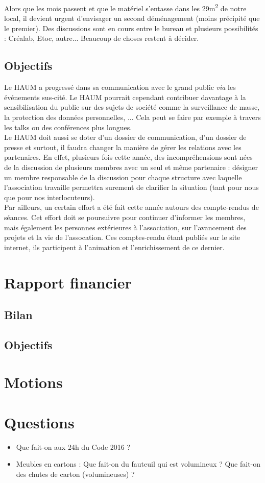 \documentclass[11pt]{article}
\begin{document}
Alors que les mois passent et que le matériel s'entasse dans les 29m\textsuperscript{2} de notre local, il devient
urgent d'envisager un second déménagement (moins précipité que le premier). Des discussions sont en cours entre le bureau et plusieurs
possibilités : Créalab, Etoc, autre... Beaucoup de choses restent à décider.

\subsection{Objectifs}

Le HAUM a progressé dans sa communication avec le grand public \textit{via} les événements sus-cité. Le HAUM pourrait cependant contribuer davantage à la sensibilisation du public sur
des sujets de société comme la surveillance de masse, la protection des données personnelles, ... Cela peut se faire par exemple à travers les talks ou des conférences plus longues.\\



Le HAUM doit aussi se doter d'un dossier de communication, d'un dossier
de presse et surtout, il faudra changer la manière de gérer les relations avec les partenaires.
En effet, plusieurs fois cette année, des incompréhensions sont nées de la discussion de plusieurs membres avec un seul
et même partenaire : désigner un membre responsable de la discussion pour chaque structure avec laquelle l'association
travaille permettra surement de clarifier la situation (tant pour nous que pour nos interlocuteurs).\\
Par ailleurs, un certain effort a \'et\'e fait cette ann\'ee autours des compte-rendus de s\'eances. Cet effort doit se poursuivre pour continuer d'informer les membres, mais \'egalement les personnes ext\'erieures \`a l'association, sur l'avancement des projets et la vie de l'assocation. Ces comptes-rendu \'etant publi\'es sur le site internet, ils participent \`a l'animation et l'enrichissement de ce dernier.

\section{Rapport financier}

\subsection{Bilan}

\subsection{Objectifs}


\section{Motions}

\section{Questions}

\begin{itemize}
	\item Que fait-on aux 24h du Code 2016 ?
	\item Meubles en cartons : Que fait-on du fauteuil qui est volumineux ? Que fait-on des chutes de carton (volumineuses) ?
\end{itemize}
\end{document}

